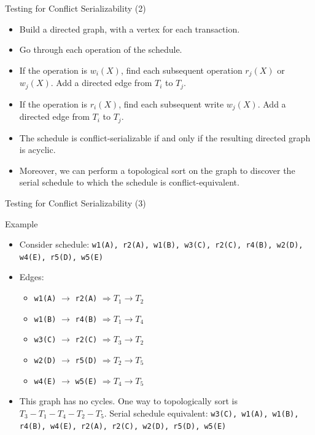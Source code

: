 \documentclass[aspectratio=169, xcolor=dvipsnames]{beamer}
\begin{document}
\begin{frame}{Testing for Conflict Serializability (2)}
    \begin{itemize}[<+->]
        \item Build a directed graph, with a vertex for each transaction.
        \item Go through each operation of the schedule.
        \item If the operation is $w_i(X)$, find each subsequent operation $r_j(X)$ or $w_j(X)$. Add a directed edge from $T_i$ to $T_j$.
        \item If the operation is $r_i(X)$, find each subsequent write $w_j(X)$. Add a directed edge from $T_i$ to $T_j$.
        \item The schedule is conflict-serializable if and only if the resulting directed graph is acyclic.
        \item Moreover, we can perform a topological sort on the graph to discover the serial schedule to which the schedule is conflict-equivalent.
    \end{itemize}
\end{frame}

\begin{frame}{Testing for Conflict Serializability (3)}
    \begin{exampleblock}{Example}
        \begin{itemize}[<+->]
            \item Consider schedule: \texttt{w1(A), r2(A), w1(B), w3(C), r2(C), r4(B), w2(D), w4(E), r5(D), w5(E)}
            \item Edges:
            \begin{itemize}[<+->]
                \item \texttt{w1(A)} $\rightarrow$ \texttt{r2(A)} $\Rightarrow T_1 \to T_2$
                \item \texttt{w1(B)} $\rightarrow$ \texttt{r4(B)} $\Rightarrow T_1 \to T_4$
                \item \texttt{w3(C)} $\rightarrow$ \texttt{r2(C)} $\Rightarrow T_3 \to T_2$
                \item \texttt{w2(D)} $\rightarrow$ \texttt{r5(D)} $\Rightarrow T_2 \to T_5$
                \item \texttt{w4(E)} $\rightarrow$ \texttt{w5(E)} $\Rightarrow T_4 \to T_5$
            \end{itemize}
        \end{itemize}
    \end{exampleblock}
    \begin{itemize}[<+->]
        \item This graph has no cycles. One way to topologically sort is $T_3-T_1-T_4-T_2-T_5$. Serial schedule equivalent: \texttt{w3(C), w1(A), w1(B), r4(B), w4(E), r2(A), r2(C), w2(D), r5(D), w5(E)}
    \end{itemize}
\end{frame}
\end{document}
